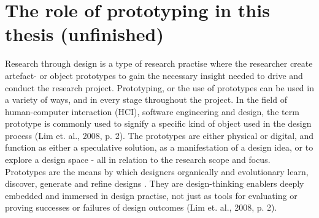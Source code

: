 \section{The role of prototyping in this thesis (unfinished)}
\autocite[p. 1]{lim_anatomy_2008}
Research through design is a type of research practise where the researcher create artefact- or object prototypes to gain the necessary insight needed to drive and conduct the research project. Prototyping, or the use of prototypes can be used in a variety of ways, and in every stage throughout the project. In the field of human-computer interaction (HCI), software engineering and design, the term prototype is commonly used to signify a specific kind of object used in the design process (Lim et. al., 2008, p. 2). The prototypes are either physical or digital, and function as either a speculative solution, as a manifestation of a design idea, or to explore a design space - all in relation to the research scope and focus. Prototypes are the means by which designers organically and evolutionary learn, discover, generate and refine designs \cite{lim_anatomy_2008, p.2}. They are design-thinking enablers deeply embedded and immersed in design practise, not just as tools for evaluating or proving successes or failures of design outcomes (Lim et. al., 2008, p. 2). 

